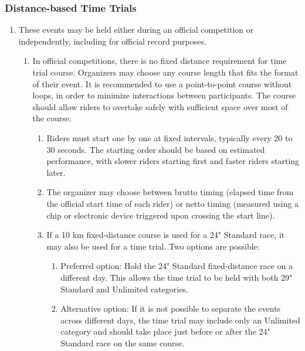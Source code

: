 \subsubsection{Distance-based Time Trials}
	\begin{enumerate}[leftmargin=1.5em,labelsep=*]
		\item These events may be held either during an official competition or independently, including for official record purposes.
		\begin{enumerate}[label*=\arabic*,leftmargin=1.5em,labelsep=*]
			\item In official competitions, there is no fixed distance requirement for time trial course.
			Organizers may choose any course length that fits the format of their event.
			It is recommended to use a point-to-point course without loops, in order to minimize interactions between participants.
			The course should allow riders to overtake safely with sufficient space over most of the course.
			\begin{enumerate}[label*=.\arabic*,leftmargin=2.25em,labelsep=*]
				\item Riders must start one by one at fixed intervals, typically every 20 to 30 seconds.
				The starting order should be based on estimated performance, with slower riders starting first and faster riders starting later.
				\item The organizer may choose between brutto timing (elapsed time from the official start time of each rider) 
                or netto timing (measured using a chip or electronic device triggered upon crossing the start line).
				\item If a 10 km fixed-distance course is used for a 24" Standard race, it may also be used for a time trial.
				Two options are possible:
				\begin{enumerate}[label=\roman*,leftmargin=2.25em,labelsep=*]
					\item Preferred option: Hold the 24" Standard fixed-distance race on a different day.
					This allows the time trial to be held with both 29" Standard and Unlimited categories.
					\item Alternative option: If it is not possible to separate the events across different days, 
                    the time trial may include only an Unlimited category and should take place just before or 
                    after the 24" Standard race on the same course.

\end{enumerate}
\end{enumerate}
\end{enumerate}
\end{enumerate}

